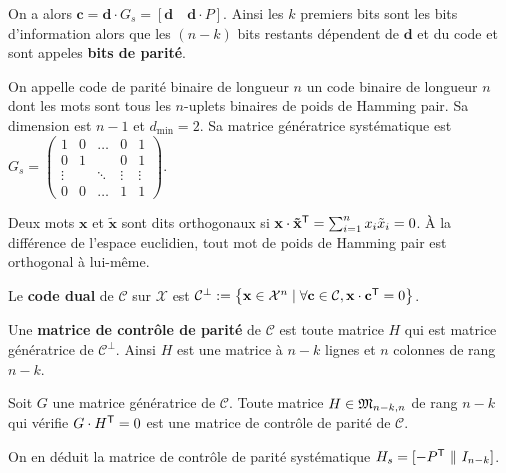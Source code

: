 	On a alors $\mathbf{c} = \mathbf{d} \cdot G_s = [\mathbf{d} \quad \mathbf{d} \cdot P]$.
	Ainsi les $k$ premiers bits sont les bits d'information alors que les $(n - k)$ bits restants dépendent de $\mathbf{d}$ et du code et sont appeles \textbf{bits de parité}.

	\begin{ex}
		On appelle code de parité binaire de longueur $n$ un code binaire de longueur $n$ dont les mots sont tous les $n$-uplets binaires de poids de Hamming pair.
		Sa dimension est $n - 1$ et $d_{\min} = 2$.
		Sa matrice génératrice systématique est $G_s = \left( \begin{smallmatrix}
			1	   & 0 & \ldots & 0	  & 1 \\
			0	   & 1 &		    & 0	  & 1 \\
			\vdots &   & \ddots & \vdots & \vdots \\
			0	   & 0 & \ldots & 1	  & 1
			\end{smallmatrix} \right)$.
	\end{ex}

	\begin{defn}
		Deux mots $\mathbf{x}$ et $\mathbf{\tilde{x}}$ sont dits orthogonaux si
		$\mathbf{x} \cdot \mathbf{\tilde{x}}^\mathsf{T} = \sum_{i = 1}^n x_i \tilde{x}_i = 0$.
		À la différence de l'espace euclidien, tout mot de poids de Hamming pair est orthogonal à lui-même.
	\end{defn}

	\begin{defn}
		Le \textbf{code dual} de $\mathcal{C}$ sur $\mathcal{X}$ est
		$\mathcal{C}^\perp := \left\{ \mathbf{x} \in \mathcal{X}^n \mid \forall \mathbf{c} \in \mathcal{C}, \mathbf{x} \cdot \mathbf{c}^\mathsf{T} = 0 \right\}$.
	\end{defn}

	\begin{defn}
		Une \textbf{matrice de contrôle de parité} de $\mathcal{C}$ est toute matrice $H$ qui est matrice génératrice de $\mathcal{C}^\perp$.
		Ainsi $H$ est une matrice à $n - k$ lignes et $n$ colonnes de rang $n - k$.
	\end{defn}

	\begin{thm}
		Soit $G$ une matrice génératrice de $\mathcal{C}$.
		Toute matrice $H \in \mathfrak{M}_{n - k, n}$ de rang $n - k$ qui vérifie $G \cdot H^\mathsf{T} = 0$ est une matrice de contrôle de parité de $\mathcal{C}$.
	\end{thm}

	On en déduit la matrice de contrôle de parité systématique $H_s = [-P^\mathsf{T} \ \Vert \ I_{n - k}]$.

